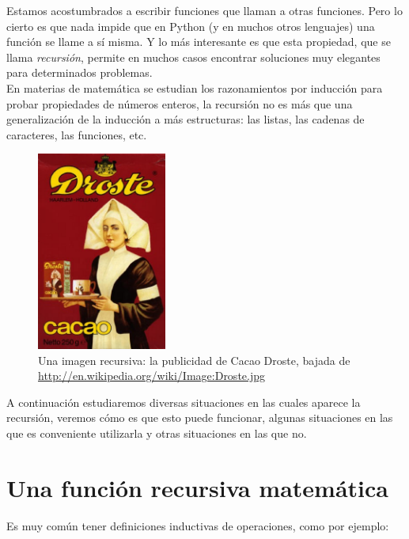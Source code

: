Estamos acostumbrados a escribir funciones que llaman a otras funciones.
Pero lo cierto es que nada impide que en Python (y en muchos otros
lenguajes) una función se llame a sí misma. Y lo más interesante es que
esta propiedad, que se llama {\it recursión}, permite en muchos casos
encontrar soluciones muy elegantes para determinados problemas. \\

En materias de matemática se estudian los razonamientos por inducción para
probar propiedades de números enteros, la recursión no es más que una
generalización de la inducción a más estructuras: las listas, las cadenas
de caracteres, las funciones, etc.

\begin{figure}
  \begin{center}
    \includegraphics[width=0.38\textwidth]{graficos/droste}
  \end{center}
  \caption{\small Una imagen recursiva: la publicidad de Cacao Droste,
bajada de \url{http://en.wikipedia.org/wiki/Image:Droste.jpg}}
\end{figure}

A continuación estudiaremos diversas situaciones en las cuales aparece la
recursión, veremos cómo es que esto puede funcionar, algunas situaciones en
las que es conveniente utilizarla y otras situaciones en las que no.


\section{Una función recursiva matemática}

Es muy común tener definiciones inductivas de operaciones, como por ejemplo:

